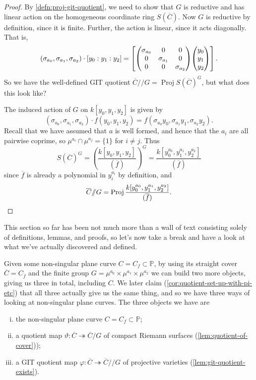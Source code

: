 \documentclass[10pt,notitlepage]{article}
\numberwithin{equation}{subsection}
\DeclareMathOperator{\proj}{Proj}
\newcommand{\pee}{\mathbb{P}}
\newcommand{\cover}[1]{\overline{#1}}
\newcommand{\sslash}{/\!\!/}
\begin{document}
        \begin{proof}
            By \cref{defn:proj-git-quotient}, we need to show that $G$ is reductive and has linear action on the homogeneous coordinate ring $S(\cover{C})$.
            Now $G$ is reductive by definition, since it is finite.
            Further, the action is linear, since it acts diagonally.
            That is,
            \[
                (\sigma_{a_0},\sigma_{a_1},\sigma_{a_2})\cdot[y_0:y_1:y_2] = \left[\mqty(\dmat[0]{\sigma_{a_0},\sigma_{a_1},\sigma_{a_2}})\mqty(y_0\\y_1\\y_2)\right].
            \]
            So we have the well-defined GIT quotient $\cover{C}\sslash G = \proj S(\cover{C})^G$, but what does this look like?

            The induced action of $G$ on $k[y_0,y_1,y_2]$ is given by
            \[
                (\sigma_{a_0},\sigma_{a_1},\sigma_{a_2})\cdot f(y_0,y_1,y_2) = f(\sigma_{a_0}y_0,\sigma_{a_1}y_1,\sigma_{a_2}y_2).
            \]
            Recall that we have assumed that $a$ is well formed, and hence that the $a_i$ are all pairwise coprime, so $\mu^{a_i}\cap\mu^{a_j}=\{1\}$ for $i\neq j$.
            Thus
            \[
                S(\cover{C})^G = \left(\frac{k[y_0,y_1,y_2]}{(\cover{f})}\right)^G = \frac{k[y_0^{a_0},y_1^{a_1},y_2^{a_2}]}{(\cover{f})}
            \]
            since $\cover{f}$ is already a polynomial in $y_i^{a_i}$ by definition, and
            \[
                \cover{C}\sslash G = \proj \frac{k[y_0^{a_0},y_1^{a_1},y_2^{a_2}]}{(\cover{f})}.\qedhere
            \]
        \end{proof}

        This section so far has been not much more than a wall of text consisting solely of definitions, lemmas, and proofs, so let's now take a break and have a look at what we've actually discovered and defined.

        Given some non-singular plane curve $C=C_f\subset\pee$, by using its straight cover $\cover{C}=C_{\cover{f}}$ and the finite group $G=\mu^{a_0}\times\mu^{a_1}\times\mu^{a_2}$ we can build two more objects, giving us three in total, including $C$.
        We later claim (\cref{cor:quotient-set-up-with-pi-etc}) that all three actually give us the same thing, and so we have three ways of looking at non-singular plane curves.
        The three objects we have are
        \begin{enumerate}[(i)]
            \item the non-singular plane curve $C=C_f\subset\pee$;
            \item a quotient map $\vartheta\colon\cover{C}\twoheadrightarrow\cover{C}/G$ of compact Riemann surfaces (\cref{lem:quotient-of-cover}));
            \item a GIT quotient map $\varphi\colon\cover{C}\twoheadrightarrow\cover{C}\sslash G$ of projective varieties (\cref{lem:git-quotient-exists}).
        \end{enumerate}
\end{document}

